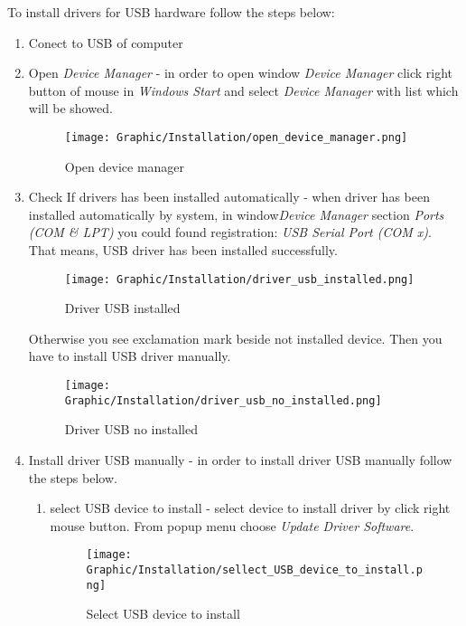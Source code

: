 To install drivers for USB hardware follow the steps below:

\begin{enumerate}

	\item Conect \deviceName to USB of computer

	\item Open \textit{Device Manager} - in order to open window \textit{Device Manager} click right button of mouse in  \textit{Windows Start} and select \textit{Device Manager} with list which will be showed.

	\begin{figure}[!h] 
	\centering \texttt{[image: Graphic/Installation/open\_device\_manager.png]}	
	\caption{Open device manager}
	\label{open_device_manager}
	\end{figure}
	\FloatBarrier

\item Check If drivers has been installed automatically - when driver has been installed automatically by system, in window\textit{Device Manager} section \textit{Ports (COM \& LPT)} you could found registration: \textit{USB Serial Port (COM x)}. That means, USB driver has been installed successfully.


	\begin{figure}[!h] 
	\centering \texttt{[image: Graphic/Installation/driver\_usb\_installed.png]}	
	\caption{Driver USB installed}
	\label{driver_USB_installed}
	\end{figure}
	\FloatBarrier

	Otherwise you see exclamation mark beside not installed device. Then you have to install USB driver manually.

	\begin{figure}[!h] 
	\centering \texttt{[image: Graphic/Installation/driver\_usb\_no\_installed.png]}	
	\caption{Driver USB no installed}
	\label{driver_USB_ no_installed}
	\end{figure}
	\FloatBarrier

\item Install driver USB manually - in order to install driver USB manually follow the steps below. 
	\begin{enumerate}
		\item select USB device to install - select device to install driver by click right mouse button. From popup menu choose \textit{Update Driver Software}.

		\begin{figure}[!h] 
		\centering \texttt{[image: Graphic/Installation/sellect\_USB\_device\_to\_install.png]}	
		\caption{Select USB device to install}
		\label{select_USB_device_ to_install}
		\end{figure}
		\FloatBarrier


\end{enumerate}
\end{enumerate}

